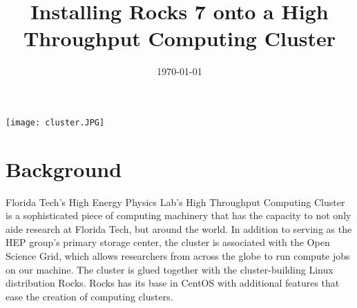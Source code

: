 \documentclass[12pt]{article}
\begin{document}

\title{Installing Rocks 7 onto a High Throughput Computing Cluster}

\date{\today}

\thispagestyle{empty}

\maketitle

\begin{center}
  \texttt{[image: cluster.JPG]}
\end{center}

\thispagestyle{empty}

\newpage



\tableofcontents

\newpage



\section{Background}

\qq Florida Tech's High Energy Physics Lab's High Throughput Computing Cluster
is a sophisticated piece of computing machinery that has the capacity to not
only aide research at Florida Tech, but around the world. In addition to serving
as the HEP group's primary storage center, the cluster is associated with the
Open Science Grid, which allows researchers from across the globe to run compute
jobs on our machine. The cluster is glued together with the cluster-building Linux distribution
Rocks. Rocks has its base in CentOS with additional features that ease the
creation of computing clusters. 
\end{document}
